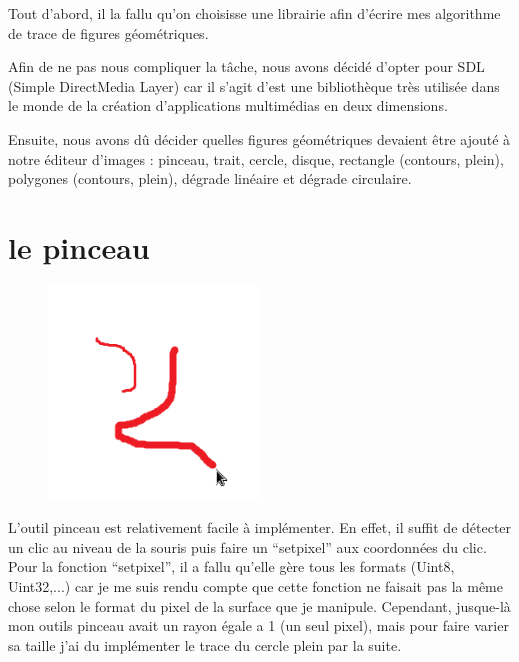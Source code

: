 \documentclass[12pt, a4paper]{report}
\begin{document}
\par Tout d’abord, il la fallu qu’on choisisse une librairie afin d’écrire mes algorithme de trace de figures géométriques. 
\par Afin de ne pas nous compliquer la tâche, nous avons décidé d’opter pour SDL (Simple DirectMedia Layer) car il s’agit d’est une bibliothèque très utilisée dans le monde de la création d'applications multimédias en deux dimensions. 
\par Ensuite, nous avons dû décider quelles figures géométriques devaient être ajouté à notre éditeur d’images : pinceau, trait,  cercle, disque, rectangle (contours, plein), polygones (contours, plein), dégrade linéaire et dégrade circulaire.

\newpage


\section {le pinceau}

\begin{figure}[!h]
\begin{center} \includegraphics[width=0.5\textwidth]{images/drag.png} \end{center}
\end{figure}


L’outil pinceau est relativement facile à implémenter. En effet, il suffit de détecter un clic au niveau de la souris puis faire un “setpixel” aux coordonnées du clic. Pour la fonction “setpixel”, il a fallu qu’elle gère tous les formats (Uint8, Uint32,...) car je me suis rendu compte que cette fonction ne faisait pas la même chose selon le format du pixel de la surface que je manipule. Cependant, jusque-là mon outils pinceau avait un rayon égale a 1 (un seul pixel), mais pour faire varier sa taille j’ai du implémenter le trace du cercle plein par la suite.
\end{document}
